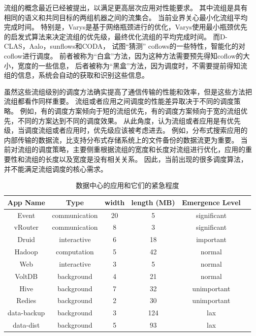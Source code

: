 流组的概念最近已经被提出\cite{chowdhury2012coflow}，以满足更高层次应用对性能要求。
其中流组是具有相同的语义和共同目标的两组机器之间的流集合。
当前业界关心最小化流组平均完成时间。
特别是，Varys是基于网络瓶颈进行的优化，Varys使用最小瓶颈优先的启发式算法来决定流组的优先级，最终优化流组的平均完成时间。
而D-CLAS\cite{luo2016towards}，Aalo\cite{chowdhury2015efficient}，sunflows\cite{huang2016sunflow}和CODA\cite{zhang2016coda}，
试图“猜测” coflows的一些特性，智能化的对coflow进行调度。
前者被称为“白盒”方法，因为这种方法需要预先得知coflow的大小，宽度的一些信息，
后者被称为“黑盒”方法，因为调度时，不需要提前得知流组的信息，系统会自动的获取和识别这些信息。


虽然这些流组级别的调度方法确实提高了通信传输的性能和效率，但是这些方法把流组都看作同样重要。
流组或者应用之间调度的性能差异取决于不同的调度策略。
例如，有的调度方案倾向于短的流组优先，有的调度方案倾向于宽的流组优先，不同的方案达到不同的调度效果。
从此角度，认为流组或者应用是有优先级，当调度流组或者应用时，优先级应该被考虑进去。
例如，分布式搜索应用的内部传输的数据流，比支持分布式存储系统上的文件备份的数据流更为重要。
当前对流组的调度策略，主要侧重根据流组的宽度和长度对流组进行优化，应用的重要性和流组的长度以及宽度是没有相关关系。
因此，当前出现的很多调度算法，并不能满足流组调度的核心需求。
\begin{table}[h]
\centering
\footnotesize
 \caption{数据中心的应用和它们的紧急程度} \label{Yosemite:measure}
\begin{tabular}{|c|c|c|c|c|c|} \hline
\toprule
App Name  & Type &  width&  length (MB)&Emergence Level\\
\midrule
Event &     communication    &20&5     &  significant \\
vRouter &  communication     &8&3 &  significant\\
Druid&     interactive   &6&18   &  important \\
Hadoop&  computation  &5&42     &  normal \\
Web&     interactive   &3&5     &  normal\\
VoltDB&     background  &4&21    &  normal\\
Hive&     background   &7&32     &  unimportant \\
Redies&    background   &2&30    &  unimportant \\
data-backup&    background   &3&124     &  lax \\
data-dist& background      &5&93  &lax \\
\bottomrule
 \end{tabular}
 \end{table}
 
